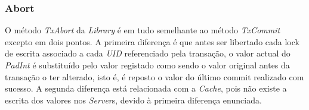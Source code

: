 \subsubsection{Abort}
\label{abort}

O método \textit{TxAbort} da \textit{Library} é em tudo semelhante ao método \textit{TxCommit} excepto em dois pontos. A primeira diferença é que antes ser libertado cada lock de escrita associado a cada \textit{UID} referenciado pela transação, o valor actual do \textit{PadInt} é substituído pelo valor registado como sendo o valor original antes da transação o ter alterado, isto é, é reposto o valor do último commit realizado com sucesso. A segunda diferença está relacionada com a \textit{Cache}, pois não existe a escrita dos valores nos \textit{Server}s, devido à primeira diferença enunciada.
